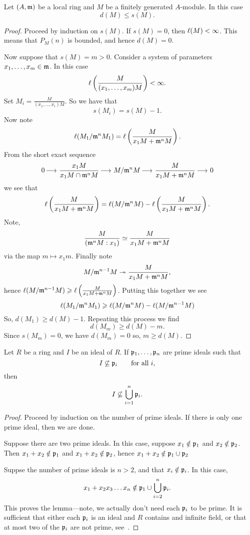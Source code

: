\documentclass{ximera}
\begin{document}
\begin{lemma}[$\boldsymbol{d(M)\le s(M)}$]\label{L:ds}
  Let $(A,\mathfrak{m})$ be a local ring and $M$ be a finitely generated
  $A$-module. In this case
  \[
  d(M)\le s(M).
  \]
  \begin{proof}
    Proceed by induction on $s(M)$. If $s(M) = 0$, then
    $\ell(M)< \infty$. This means that $P_M(n)$ is bounded, and hence
    $d(M) = 0$.

    Now suppose that $s(M) = m >0$. Consider a system of
    parameters $x_1,\dots, x_m\in \mathfrak{m}$. In this case
    \[
    \ell\left( \frac{M}{(x_1,\dots,x_m)M} \right)<\infty.
    \]
    Set $M_i = \frac{M}{(x_1,\dots,x_i)M}$. So we have that
    \[
    s(M_i) = s(M)-1.
    \]
    Now note
    \[
    \ell(M_1/\mathfrak{m}^n M_1) = \ell\left(\frac{M}{x_1 M + \mathfrak{m}^n M}\right).
    \]
    From the short exact sequence
    \[
    0\mathop{\longrightarrow\,}\limits \frac{x_1M}{x_1 M \cap \mathfrak{m}^n M} \mathop{\longrightarrow\,}\limits  M/\mathfrak{m}^n M \mathop{\longrightarrow\,}\limits \frac{M}{x_1 M + \mathfrak{m}^n M}\mathop{\longrightarrow\,}\limits 0
    \]
    we see that
    \[
    \ell\left(\frac{M}{x_1 M + \mathfrak{m}^n M}\right) = \ell(M/\mathfrak{m}^n M) - \ell \left(\frac{M}{x_1 M + \mathfrak{m}^n M}\right).
    \]
    Note,
    \[
    \frac{M}{(\mathfrak{m}^nM:x_1)}\simeq \frac{M}{x_1 M + \mathfrak{m}^n M}
    \]
    via the map $m\mapsto x_1 m$. Finally note
    \[
    M/\mathfrak{m}^{n-1}M \twoheadrightarrow \frac{M}{x_1 M + \mathfrak{m}^n M},
    \]
    hence $\ell(M/\mathfrak{m}^{n-1}M)\geqslant \ell\left(\frac{M}{x_1 M + \mathfrak{m}^n
      M}\right)$. Putting this together we see
    \[
    \ell(M_1/\mathfrak{m}^n M_1) \geqslant \ell(M/\mathfrak{m}^n M) - \ell(M/\mathfrak{m}^{n-1}M)
    \]
    So, $d(M_1) \ge d(M) - 1$. Repeating this process we find
    \[
    d(M_m) \ge d(M) -m.
    \]
    Since $s(M_m) = 0$, we have $d(M_m) = 0$ so, $m\ge d(M)$.
  \end{proof}
\end{lemma}





\begin{lemma}\label{L:PA}
Let $R$ be a ring and $I$ be an ideal of $R$.  If $\mathfrak{p}_1,\ldots,\mathfrak{p}_n$
are prime ideals such that
\[
I \not\subseteq \mathfrak{p}_i \qquad\text{for all $i$,}
\]
then 
\[
I \not\subseteq \bigcup_{i = 1}^n \mathfrak{p}_i.
\]
\begin{proof}
  Proceed by induction on the number of prime ideals. If there is only
  one prime ideal, then we are done.

  Suppose there are two prime ideals. In this case, suppose
  $x_1\notin\mathfrak{p}_1$ and $x_2\notin\mathfrak{p}_2$. Then $x_1+x_2\notin
  \mathfrak{p}_1$ and $x_1+x_2\notin \mathfrak{p}_2$, hence $x_1+x_2\notin\mathfrak{p}_1\cup\mathfrak{p}_2$
  
  Suppse the number of prime ideals is $n>2$, and that
  $x_i\notin\mathfrak{p}_i$. In this case,
  \[
  x_1+ x_2x_3\dots x_n \notin \mathfrak{p}_1\cup \bigcup_{i=2}^n \mathfrak{p}_i.
  \]
  This proves the lemma---note, we actually don't need each $\mathfrak{p}_i$ to
  be prime. It is sufficient that either each $\mathfrak{p}_i$ is an ideal and
  $R$ contains and infinite field, or that at most two of the $\mathfrak{p}_i$
  are not prime, see~\cite{dE1995}.
\end{proof}
\end{lemma}
\end{document}
